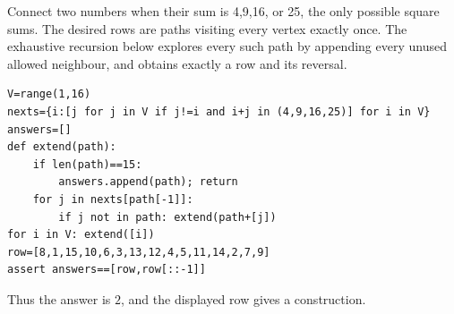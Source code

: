 Connect two numbers when their sum is 4,9,16, or 25, the only possible square sums. The desired rows are paths visiting every vertex exactly once. The exhaustive recursion below explores every such path by appending every unused allowed neighbour, and obtains exactly a row and its reversal.
\begin{verbatim}
V=range(1,16)
nexts={i:[j for j in V if j!=i and i+j in (4,9,16,25)] for i in V}
answers=[]
def extend(path):
    if len(path)==15:
        answers.append(path); return
    for j in nexts[path[-1]]:
        if j not in path: extend(path+[j])
for i in V: extend([i])
row=[8,1,15,10,6,3,13,12,4,5,11,14,2,7,9]
assert answers==[row,row[::-1]]
\end{verbatim}
Thus the answer is $\boxed2$, and the displayed row gives a construction.
